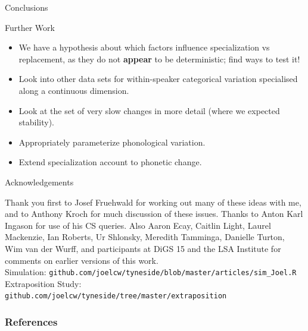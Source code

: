\documentclass[hyperref={pdfpagelabels=false}]{beamer}
\begin{document}
\begin{frame}{Conclusions}
	\begin{block}{Further Work}
		\begin{itemize}
			\item We have a hypothesis about which factors influence specialization vs replacement, as they do not \textbf{appear} to be deterministic; find ways to test it!
			\item Look into other data sets for within-speaker categorical variation specialised along a continuous dimension.
			\item Look at the set of very slow changes in more detail (where we expected stability).
			\item Appropriately parameterize phonological variation.
			\item Extend specialization account to phonetic change.
		\end{itemize}
	\end{block}

\end{frame}

\begin{frame}{Acknowledgements}
\begin{center}
Thank you first to Josef Fruehwald for working out many of these ideas with me, and to Anthony Kroch for much discussion of these issues. Thanks to Anton Karl Ingason for use of his CS queries. Also Aaron Ecay, Caitlin Light, Laurel Mackenzie, Ian Roberts, Ur Shlonsky, Meredith Tamminga, Danielle Turton, Wim van der Wurff, and participants at DiGS 15 and the LSA Institute for comments on earlier versions of this work. 
\vspace{5mm}\\
Simulation: \texttt{github.com/joelcw/tyneside/blob/master/articles/sim\_Joel.R}
\vspace{1mm}\\
Extraposition Study: \texttt{github.com/joelcw/tyneside/tree/master/extraposition}
\end{center}
\end{frame}


\begin{frame}[allowframebreaks]
\frametitle{References}
\newcommand*{\newblock}{natbib}


\end{frame}
\end{document}
